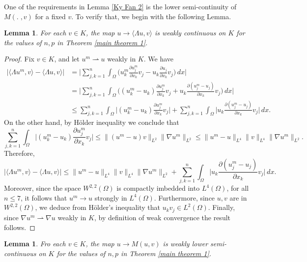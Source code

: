 \documentclass[10pt,a4paper]{amsart}
\numberwithin{equation}{section}
\newtheorem{lemma}[theorem]{Lemma}
\begin{document}
One of the requirements in Lemma \ref{Ky Fan 2} is  the lower semi-continuity of
$M(.\;,v)$ for a fixed $v$. To verify  that, we begin with the following Lemma.

\begin{lemma}\label{lem SC 1}
For each \( v\in K\), the map   \( u\to\langle \Lambda u, v\rangle  \) is weakly
continuous on \(K\) for the values of  \( n,p \) in Theorem \ref{main theorem 1}.
\end{lemma}

\begin{proof}
Fix \( v \in  K\), and let  \(u^m\rightharpoonup u\) weakly in \(K\). We have
\begin{align*}
\big| \langle \Lambda u^m, v\rangle -  \langle \Lambda u, v\rangle  \big|
&=\Big|\sum_{j,k=1}^n\int_\Omega\big(u_k^m\frac{\partial u_j^m}{\partial x_k}v_j
 -u_k\frac{\partial u_j}{\partial x_k}v_j\big) \,dx\Big| \\
&=\Big|\sum_{j,k=1}^n\int_\Omega\big( (u_k^m-u_k)\frac{\partial u_j^m}{\partial x_k}v_j
 +u_k\frac{\partial (u_j^m-u_j)}{\partial x_k}v_j\big) \,dx\Big| \\
&\leq \sum_{j,k=1}^n\int_\Omega\Big| (u_k^m-u_k)\frac{\partial u_j^m}{\partial x_k}v_j
 \Big|
+\sum_{j,k=1}^n\int_\Omega \Big| u_k\frac{\partial (u_j^m-u_j)}{\partial x_k}v_j\Big|
\,dx.
\end{align*}
On the other hand, by H\"{o}lder inequality we conclude that
\[
\sum_{j,k=1}^n\int_\Omega\Big| (u_k^m-u_k)\frac{\partial u_j^m}{\partial x_k}v_j\Big|
    \leq \rVert (u^m-u)v \rVert_{L^2}\rVert \nabla u^m \rVert_{L^2}
    \leq \rVert u^m-u \rVert_{L^4}\rVert v \rVert_{L^4} \rVert \nabla u^m \rVert_{L^2}.
\]
Therefore,
\[
\big| \langle\Lambda u^m, v\rangle -  \langle\Lambda u, v\rangle \big|
\leq \rVert u^m-u \rVert_{L^4}\rVert v \rVert_{L^4} \rVert \nabla u^m \rVert_{L^2}
 +\sum_{j,k=1}^n\int_\Omega \Big| u_k\frac{\partial (u_j^m-u_j)}{\partial x_k}v_j\Big|
 \,dx.
\]
Moreover, since the space \(W^{2,2}(\Omega)\) is compactly imbedded into
\(L^4(\Omega)\), for all \(n\leq 7\),  it follows that \(u^m\to u\) strongly
in \(L^4(\Omega)\).
Furthermore, since $u,v$ are in \(W^{2,2}(\Omega)\), we deduce
from H\"{o}lder's inequality that \(u_kv_j\in L^2(\Omega)\).
Finally,  since  \(\nabla u^m\rightharpoonup \nabla u\) weakly in \(K\),  by
definition of weak convergence  the result follows.
\end{proof}

\begin{lemma} \label{WLSC}
Fro each  \( v\in K\), the map \(u\to M(u, v) \) is weakly lower semi-continuous on
\(K\) for the values of  \( n,p \) in Theorem \ref{main theorem 1}.
\end{lemma}
\end{document}
